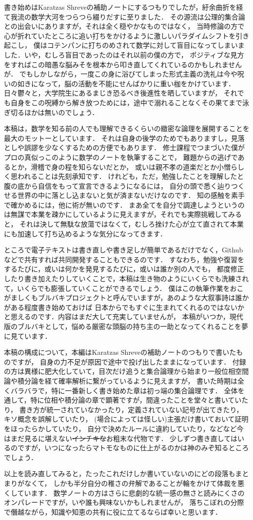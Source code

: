 
書き始めはKaratzas Shreveの補助ノートにするつもりでしたが，紆余曲折を経て我流の数学大河をつらつら綴りだすに至りました．
その源流は公理的集合論との出会いにありますが，それは全く穏やかなものではなく，
当時修論の方で心が折れていたところに追い打ちをかけるように激しいパラダイムシフトを引き起こし，
僕はコテンパンに打ちのめされて数学に対して盲目になってしまいました．いや，むしろ盲目であったのはそれ以前の僕の方で，
ポジティブな見方をすればこの暗愚な脳みそを根本から叩き直してくれているのかもしれませんが．
でもしかしながら，一度この身に浴びてしまった形式主義の洗礼は今や呪いの如きになって，脳の活動を不能にせんばかりに重い枷をかけています．
日々鬱々と，大学院生にあるまじき恐るべき後進性を晒していますが，
それでも自身をこの呪縛から解き放つためには，途中で溺れることなくその果てまで泳ぎ切るほかは無いのでしょう．

本稿は，数学を知る前の人でも理解できるくらいの緻密な論理を展開することを最大のモットーとしています．
それは自身の後学のためでもありますし，見落としや誤謬を少なくするための方便でもあります．
修士課程でつまづいた僕がプロの真似っこのように数学のノートを執筆することで，
難題からの逃げであるとか，滑稽で身の程を知らないだとか，
或いは親不孝の道楽だとか小憎らしく思われることは先刻承知です．
けれども，ただ，勉強したことを理解したと腹の底から自信をもって宣言できるようになるには，
自分の頭で悉く辿りつくせる世界の中に落とし込まないと気が済まないだけなのです．
知の感触を素手で確かめるには，他に術が無いのです．
まあ全てを自分で調達しようというのは無謀で本業を疎かにしているように見えますが，それでも実際挑戦してみると，
それは決して無駄な放蕩ではなくて，むしろ挫けた心が立て直されて本業にも加速して打ち込めるような気分になってきます．

ところで電子テキストは書き直しや書き足しが簡単であるだけでなく，Githubなどで共有すれば共同開発することもできるのです．
すなわち，勉強や復習をするたびに，或いは何かを発見するたびに，或いは誰か別の人でも，
都度修正したり書き加えたりしていくことで，本稿は生き物のようにいくらでも洗練されて，いくらでも膨張していくことができるでしょう．
僕はこの執筆作業をおこがましくもブルバキプロジェクトと呼んでいますが，あのような大叙事詩は誰かがある程度書き始めておけば
日本からでもすぐに生まれてくれるのではないかと思えるのです．内容はまだ大して充実していませんが，
本稿がいつか，現代版のブルバキとして，悩める厳密な頭脳の持ち主の一助となってくれることを夢に見ています．

本稿の構成について，本編はKaratzas Shreveの補助ノートのつもりで書いたものですが，
自身の力不足が原因で途中で投げ出したままになっています．
付録の方は異様に肥大化していて，目次だけ追うと集合論理から始まり一般位相空間論や積分論を経て確率解析に繋がっているように見えますが，
書いた時期は全くバラバラで，特に一番新しく書き始めた章は初っ端の集合論理です．
全体を通して，特に位相や積分論の章で顕著ですが，間違ったことを堂々と書いていたり，
書き方が統一されていなかったり，定義されていない記号が出てきたり，キソ概念を誤解していたり，
(場合によっては怪しい)主張だけ書いておいて証明をほったらかしていたり，
自分で決めたルールに違約していたり，などなど今はまだ見るに堪えない\sout{インチキな}お粗末な代物です．
少しずつ書き直してはいるのですが，いつになったらマトモなものに仕上がるのかは神のみぞ知るところでしょう．

以上を読み直してみると，たったこれだけしか書いていないのにどの段落もまとまりがなくて，
しかも半分自分の稚さの弁解であることが輪をかけて体裁を悪くしています．
数学ノートの方はさらに悲劇的な統一感の無さと読みにくさのオンパレードですが，いや誰も興味ないかもしれませんが，
落ちこぼれの分際で僭越ながら，知識や知恵の共有に役に立てるならば幸いと思います．

